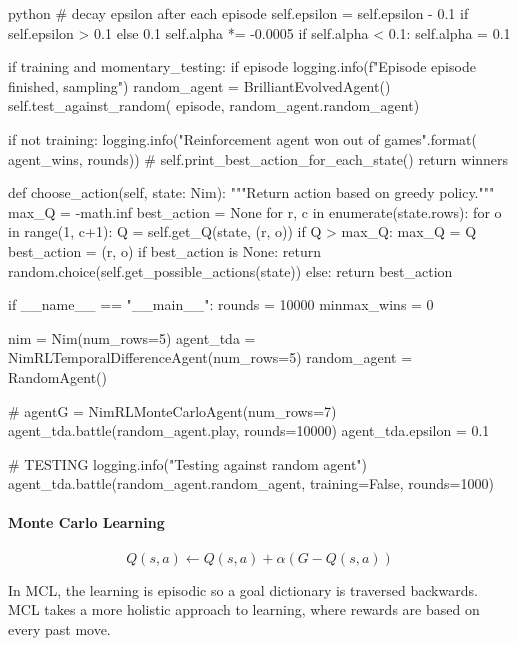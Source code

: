 \begin{mintedbox}{python}
        # decay epsilon after each episode
        self.epsilon = self.epsilon - 0.1 if self.epsilon > 0.1 else 0.1
        self.alpha *= -0.0005
        if self.alpha < 0.1:
            self.alpha = 0.1

        if training and momentary_testing:
            if episode %
                logging.info(f"Episode {episode} finished, sampling")
                random_agent = BrilliantEvolvedAgent()
                self.test_against_random(
                    episode, random_agent.random_agent)

    if not training:
        logging.info("Reinforcement agent won {} out of {} games".format(
            agent_wins, rounds))
    # self.print_best_action_for_each_state()
    return winners

def choose_action(self, state: Nim):
    """Return action based on greedy policy."""
    max_Q = -math.inf
    best_action = None
    for r, c in enumerate(state.rows):
        for o in range(1, c+1):
            Q = self.get_Q(state, (r, o))
            if Q > max_Q:
                max_Q = Q
                best_action = (r, o)
    if best_action is None:
        return random.choice(self.get_possible_actions(state))
    else:
        return best_action

if __name__ == "__main__":
rounds = 10000
minmax_wins = 0

nim = Nim(num_rows=5)
agent_tda = NimRLTemporalDifferenceAgent(num_rows=5)
random_agent = RandomAgent()

# agentG = NimRLMonteCarloAgent(num_rows=7)
agent_tda.battle(random_agent.play, rounds=10000)
agent_tda.epsilon = 0.1

# TESTING
logging.info("Testing against random agent")
agent_tda.battle(random_agent.random_agent, training=False, rounds=1000)
\end{mintedbox}

\paragraph{Monte Carlo Learning}

\begin{equation*}
    Q(s, a) \leftarrow Q(s, a) + \alpha \left( G - Q(s, a) \right)
\end{equation*}

In MCL, the learning is episodic so a goal dictionary is traversed backwards. MCL takes a more holistic approach to learning, where rewards are based on every past move.

